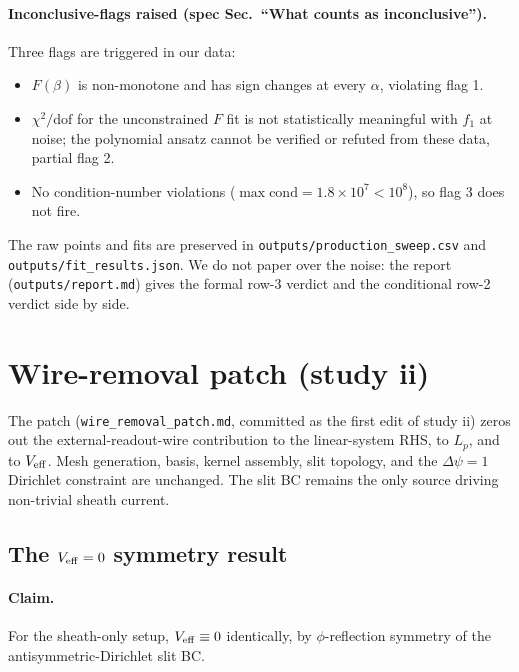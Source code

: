 \documentclass[11pt]{article}
\begin{document}
\paragraph{Inconclusive-flags raised (spec Sec.~``What counts as
inconclusive'').}  Three flags are triggered in our data:
\begin{itemize}
\item $F(\beta)$ is non-monotone and has sign changes at every
$\alpha$, violating flag 1.
\item $\chi^2/\mathrm{dof}$ for the unconstrained $F$ fit is not
statistically meaningful with $f_1$ at noise; the polynomial ansatz
cannot be verified or refuted from these data, partial flag 2.
\item No condition-number violations ($\max\mathrm{cond}=1.8\times 10^7
<10^8$), so flag 3 does not fire.
\end{itemize}
The raw points and fits are preserved in
\texttt{outputs/production\_sweep.csv} and
\texttt{outputs/fit\_results.json}.  We do not paper over the noise:
the report (\texttt{outputs/report.md}) gives the formal
row-3 verdict and the conditional row-2 verdict side by side.

\section{Wire-removal patch (study ii)}
\label{sec:patch}

The patch (\texttt{wire\_removal\_patch.md}, committed as the first
edit of study ii) zeros out the external-readout-wire contribution to
the linear-system RHS, to $L_p$, and to $V_{\rm eff}$.  Mesh
generation, basis, kernel assembly, slit topology, and the
$\Delta\psi\!=\!1$ Dirichlet constraint are unchanged.  The slit BC
remains the only source driving non-trivial sheath current.

\subsection{The $V_{\rm eff}=0$ symmetry result}

\paragraph{Claim.}  For the sheath-only setup, $V_{\rm eff}\equiv 0$
identically, by $\phi$-reflection symmetry of the
antisymmetric-Dirichlet slit BC.
\end{document}
